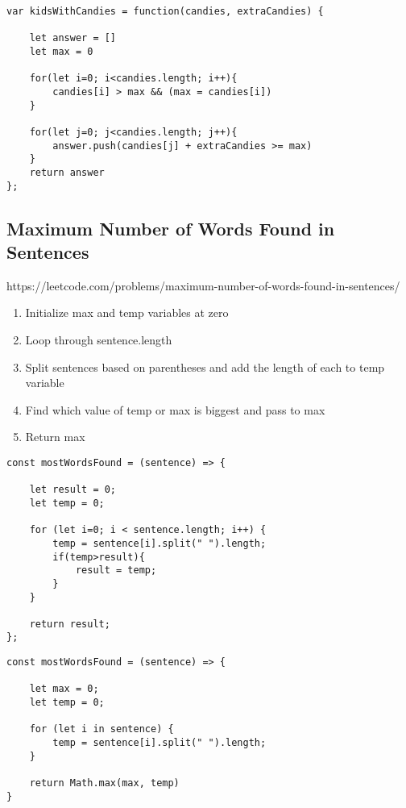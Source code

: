 \documentclass[10pt]{article}
\begin{document}
\begin{lstlisting}[title=Solution kidsWithCandies with for loop, captionpos=t]
var kidsWithCandies = function(candies, extraCandies) {
    
    let answer = []
    let max = 0
    
    for(let i=0; i<candies.length; i++){
        candies[i] > max && (max = candies[i])
    }
    
    for(let j=0; j<candies.length; j++){
        answer.push(candies[j] + extraCandies >= max)
    }
    return answer
};
\end{lstlisting}
\medskip %

\pagebreak
\medskip %
\subsection{Maximum Number of Words Found in Sentences}
https://leetcode.com/problems/maximum-number-of-words-found-in-sentences/

\begin{enumerate}
	\item Initialize max and temp variables at zero 
	\item Loop through sentence.length 
	\item Split sentences based on parentheses and add the length of each to temp variable 
	\item Find which value of temp or max is biggest and pass to max
	\item Return max
\end{enumerate}

\begin{lstlisting}[title=Solution mostWordsFound, captionpos=t]
const mostWordsFound = (sentence) => {

    let result = 0;
    let temp = 0;

    for (let i=0; i < sentence.length; i++) {
        temp = sentence[i].split(" ").length;
        if(temp>result){
            result = temp;
        }
    }
    
    return result;
};
\end{lstlisting}

\begin{lstlisting}[title=Solution mostWordsFound with for-in loop and Math.max, captionpos=t]
const mostWordsFound = (sentence) => {
    
    let max = 0;
    let temp = 0;
    
    for (let i in sentence) {
        temp = sentence[i].split(" ").length;
    }
    
    return Math.max(max, temp)
}
\end{lstlisting}
\medskip %
\end{document}
